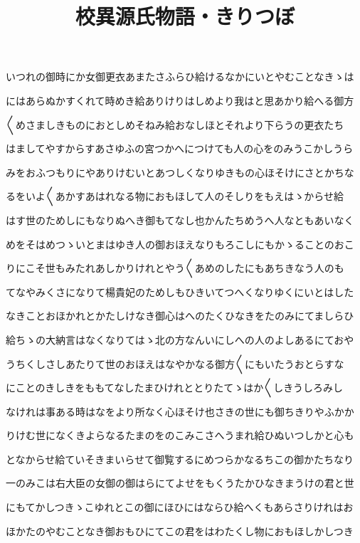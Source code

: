 \documentclass[a4paper,11pt,landscape]{ltjtarticle}
\title{校異源氏物語・きりつぼ}
\date{}
\begin{document}
\maketitle

いつれの御時にか女御更衣あまたさふらひ給けるなかにいとやむことなきゝは
\par\medskip
にはあらぬかすくれて時めき給ありけりはしめより我はと思あかり給へる御方
\par\medskip
〱めさましきものにおとしめそねみ給おなしほとそれより下らうの更衣たち
\par\medskip
はましてやすからすあさゆふの宮つかへにつけても人の心をのみうこかしうら
\par\medskip
みをおふつもりにやありけむいとあつしくなりゆきもの心ほそけにさとかちな
\par\medskip
るをいよ〱あかすあはれなる物におもほして人のそしりをもえはゝからせ給
\par\medskip
はす世のためしにもなりぬへき御もてなし也かんたちめうへ人なともあいなく
\par\medskip
めをそはめつゝいとまはゆき人の御おほえなりもろこしにもかゝることのおこ
\par\medskip
りにこそ世もみたれあしかりけれとやう〱あめのしたにもあちきなう人のも
\par\medskip
てなやみくさになりて楊貴妃のためしもひきいてつへくなりゆくにいとはした
\par\medskip
なきことおほかれとかたしけなき御心はへのたくひなきをたのみにてましらひ
\par\medskip
給ちゝの大納言はなくなりてはゝ北の方なんいにしへの人のよしあるにておや
\par\medskip
うちくしさしあたりて世のおほえはなやかなる御方〱にもいたうおとらすな
\par\medskip
にことのきしきをももてなしたまひけれととりたてゝはか〱しきうしろみし
\par\medskip
なけれは事ある時はなをより所なく心ほそけ也さきの世にも御ちきりやふかか
\par\medskip
りけむ世になくきよらなるたまのをのこみこさへうまれ給ひぬいつしかと心も
\par\medskip
となからせ給ていそきまいらせて御覧するにめつらかなるちこの御かたちなり
\par\medskip
一のみこは右大臣の女御の御はらにてよせをもくうたかひなきまうけの君と世
\par\medskip
にもてかしつきゝこゆれとこの御にほひにはならひ給へくもあらさりけれはお
\par\medskip
ほかたのやむことなき御おもひにてこの君をはわたくし物におもほしかしつき
\end{document}
